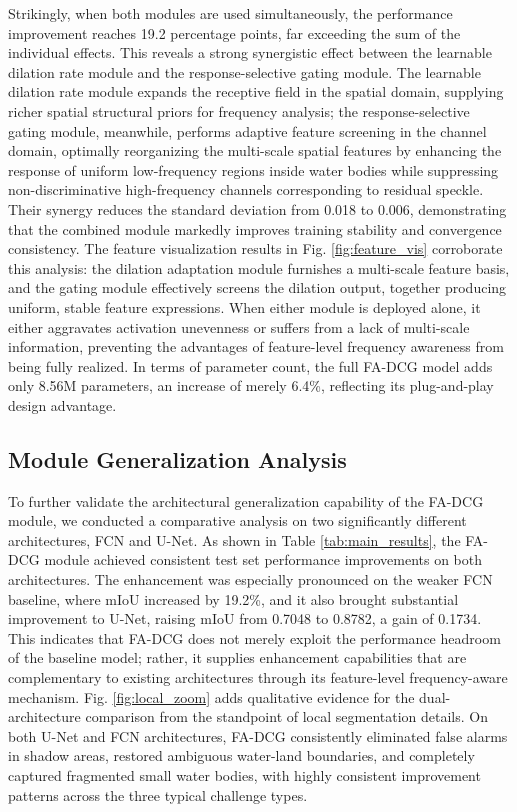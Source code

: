 \documentclass[lettersize,journal]{IEEEtran}
\begin{document}
Strikingly, when both modules are used simultaneously, the performance improvement reaches 19.2 percentage points, far exceeding the sum of the individual effects. This reveals a strong synergistic effect between the learnable dilation rate module and the response-selective gating module. The learnable dilation rate module expands the receptive field in the spatial domain, supplying richer spatial structural priors for frequency analysis; the response-selective gating module, meanwhile, performs adaptive feature screening in the channel domain, optimally reorganizing the multi-scale spatial features by enhancing the response of uniform low-frequency regions inside water bodies while suppressing non-discriminative high-frequency channels corresponding to residual speckle. Their synergy reduces the standard deviation from 0.018 to 0.006, demonstrating that the combined module markedly improves training stability and convergence consistency. The feature visualization results in Fig. \ref{fig:feature_vis} corroborate this analysis: the dilation adaptation module furnishes a multi-scale feature basis, and the gating module effectively screens the dilation output, together producing uniform, stable feature expressions. When either module is deployed alone, it either aggravates activation unevenness or suffers from a lack of multi-scale information, preventing the advantages of feature-level frequency awareness from being fully realized. In terms of parameter count, the full FA-DCG model adds only 8.56M parameters, an increase of merely 6.4\%, reflecting its plug-and-play design advantage.

\subsection{Module Generalization Analysis}

To further validate the architectural generalization capability of the FA-DCG module, we conducted a comparative analysis on two significantly different architectures, FCN and U-Net. As shown in Table \ref{tab:main_results}, the FA-DCG module achieved consistent test set performance improvements on both architectures. The enhancement was especially pronounced on the weaker FCN baseline, where mIoU increased by 19.2\%, and it also brought substantial improvement to U-Net, raising mIoU from 0.7048 to 0.8782, a gain of 0.1734. This indicates that FA-DCG does not merely exploit the performance headroom of the baseline model; rather, it supplies enhancement capabilities that are complementary to existing architectures through its feature-level frequency-aware mechanism. Fig. \ref{fig:local_zoom} adds qualitative evidence for the dual-architecture comparison from the standpoint of local segmentation details. On both U-Net and FCN architectures, FA-DCG consistently eliminated false alarms in shadow areas, restored ambiguous water-land boundaries, and completely captured fragmented small water bodies, with highly consistent improvement patterns across the three typical challenge types.
\end{document}
